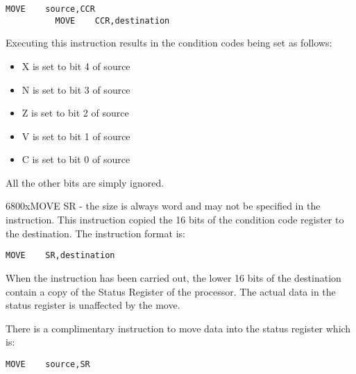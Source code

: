 \begin{lstlisting}[firstnumber=1,]
          MOVE    source,CCR
          MOVE    CCR,destination
\end{lstlisting}

Executing this instruction results in the condition codes being set
    as follows:
\begin{itemize}[itemsep=0pt]

\item{}X is set to bit 4 of source


\item{}N is set to bit 3 of source


\item{}Z is set to bit 2 of source


\item{}V is set to bit 1 of source


\item{}C is set to bit 0 of source

\end{itemize}

All the other bits are simply ignored.

\mc6800x{MOVE SR} -{} the size is always word and may not be specified in the
    instruction. This instruction copied the 16 bits of the condition code
    register to the destination. The instruction format is:

\begin{lstlisting}[firstnumber=1,]
          MOVE    SR,destination
\end{lstlisting}

When the instruction has been carried out, the lower 16 bits of the
    destination contain a copy of the Status Register of the processor. The
    actual data in the status register is unaffected by the move.

There is a complimentary instruction to move data into the status
    register which is:

\begin{lstlisting}[firstnumber=1,]
          MOVE    source,SR
\end{lstlisting}


